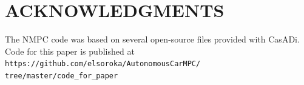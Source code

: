 \documentclass[letterpaper, 10 pt, conference]{ieeeconf}  %
\begin{document}








\section{ACKNOWLEDGMENTS}

The NMPC code was based on several open-source files provided with CasADi.
Code for this paper is published at \small\texttt{https://github.com/elsoroka/AutonomousCarMPC/
	tree/master/code\_for\_paper}\normalsize






\end{document}
